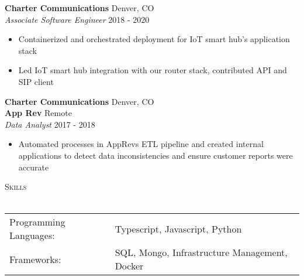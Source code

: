 \documentclass[a4paper]{article}
\newcommand{\lineunder} {
    \vspace*{-8pt} \\
    \hspace*{-18pt} \hrulefill \\
}
\newcommand{\header} [1] {
    {\hspace*{-18pt}\vspace*{6pt} \textsc{#1}}
    \vspace*{-6pt} \lineunder
}
\begin{document}
\textbf{Charter Communications} \hfill Denver, CO\\
\textit{Associate Software Engineer} \hfill 2018 - 2020\\
\vspace{-1mm}
\begin{itemize} \itemsep 1pt
	\item Containerized and orchestrated deployment for IoT smart hub’s application stack
	\item Led IoT smart hub integration with our router stack, contributed API and SIP client
\end{itemize}
\textbf{Charter Communications} \hfill Denver, CO\\

\textbf{App Rev} \hfill Remote\\
\textit{Data Analyst} \hfill 2017 - 2018\\
\vspace{-1mm}
\begin{itemize} \itemsep 1pt
	\item Automated processes in AppRev\textquotesingle{}s ETL pipeline and created internal applications to detect data inconsistencies and ensure customer reports were accurate
\end{itemize}

\header{Skills}
\begin{tabular}{ l l }
	Programming Languages: & Typescript, Javascript, Python                \\
	Frameworks:            & SQL, Mongo, Infrastructure Management, Docker \\
\end{tabular}
\vspace{2mm}





\ 
\end{document}
